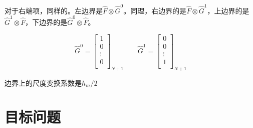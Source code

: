 \documentclass[UTF8,12pt]{article}
\begin{document}
对于右端项，同样的。左边界是$\hat{F} \otimes \hat{G}^0$。同理，右边界的是$\hat{F} \otimes \hat{G}^1$，上边界的是$\hat{G}^1 \otimes \hat{F}$，下边界的是$\hat{G}^0 \otimes \hat{F}$。

\begin{equation}
\hat{G}^0 = \left[ \begin{array}{c}
1 \\
0 \\
\vdots \\
0 \\
\end{array} \right]_{N+1}
\qquad
\hat{G}^1 = \left[ \begin{array}{c}
0 \\
0 \\
\vdots \\
1 \\
\end{array} \right]_{N+1}
\end{equation}

边界上的尺度变换系数是$h_m/2$




\section{目标问题}
\end{document}
